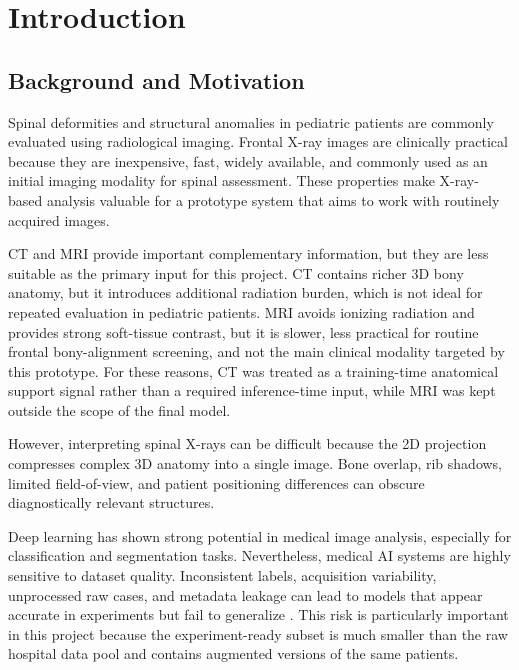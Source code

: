 \chapter{Introduction}
\label{ch:introduction}

\section{Background and Motivation}
Spinal deformities and structural anomalies in pediatric patients are commonly evaluated using radiological imaging. Frontal X-ray images are clinically practical because they are inexpensive, fast, widely available, and commonly used as an initial imaging modality for spinal assessment. These properties make X-ray-based analysis valuable for a prototype system that aims to work with routinely acquired images.

CT and MRI provide important complementary information, but they are less suitable as the primary input for this project. CT contains richer 3D bony anatomy, but it introduces additional radiation burden, which is not ideal for repeated evaluation in pediatric patients. MRI avoids ionizing radiation and provides strong soft-tissue contrast, but it is slower, less practical for routine frontal bony-alignment screening, and not the main clinical modality targeted by this prototype. For these reasons, CT was treated as a training-time anatomical support signal rather than a required inference-time input, while MRI was kept outside the scope of the final model.

However, interpreting spinal X-rays can be difficult because the 2D projection compresses complex 3D anatomy into a single image. Bone overlap, rib shadows, limited field-of-view, and patient positioning differences can obscure diagnostically relevant structures.

Deep learning has shown strong potential in medical image analysis, especially for classification and segmentation tasks. Nevertheless, medical AI systems are highly sensitive to dataset quality. Inconsistent labels, acquisition variability, unprocessed raw cases, and metadata leakage can lead to models that appear accurate in experiments but fail to generalize \cite{zech2018variable,roberts2021common}. This risk is particularly important in this project because the experiment-ready subset is much smaller than the raw hospital data pool and contains augmented versions of the same patients.

